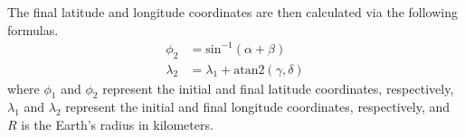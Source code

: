 \documentclass{article}
\begin{document}
The final latitude and longitude coordinates are then calculated via the following formulas.
\begin{align*}
    \phi_2 &= \text{sin}^{-1} \left( \alpha
    + \beta \right) \\
    \lambda_2 &= \lambda_1 + \text{atan2} \left( 
    \gamma, \delta \right)
\end{align*}
where $\phi_1$ and $\phi_2$ represent the initial and final latitude coordinates, respectively, $\lambda_1$ and $\lambda_2$ represent the initial and final longitude coordinates, respectively, and $R$ is the Earth's radius in kilometers.
\end{document}
